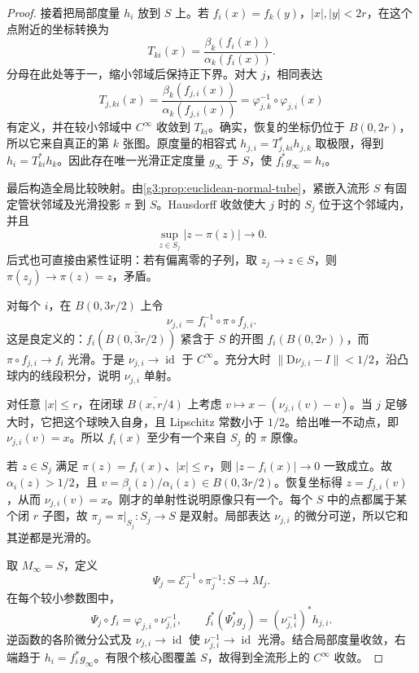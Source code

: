 \begin{proof}
	接着把局部度量 \(h_i\) 放到 \(S\) 上。若 \(f_i(x)=f_k(y)\)，\(|x|,|y|<2r\)，在这个点附近的坐标转换为
	\[
		T_{ki}(x)=\frac{\beta_k(f_i(x))}{\alpha_k(f_i(x))}.
	\]
	分母在此处等于一，缩小邻域后保持正下界。对大 \(j\)，相同表达
	\[
		T_{j,ki}(x)=\frac{\beta_k(f_{j,i}(x))}
		{\alpha_k(f_{j,i}(x))}
		=\varphi_{j,k}^{-1}\circ\varphi_{j,i}(x)
	\]
	有定义，并在较小邻域中 \(C^\infty\) 收敛到 \(T_{ki}\)。确实，恢复的坐标仍位于 \(B(0,2r)\)，所以它来自真正的第 \(k\) 张图。原度量的相容式
	\(h_{j,i}=T_{j,ki}^*h_{j,k}\) 取极限，得到
	\(h_i=T_{ki}^*h_k\)。因此存在唯一光滑正定度量 \(g_\infty\) 于 \(S\)，使 \(f_i^*g_\infty=h_i\)。

	最后构造全局比较映射。由\cref{g3:prop:euclidean-normal-tube}，紧嵌入流形 \(S\) 有固定管状邻域及光滑投影 \(\pi\) 到 \(S\)。Hausdorff 收敛使大 \(j\) 时的 \(S_j\) 位于这个邻域内，并且
	\[
		\sup_{z\in S_j}|z-\pi(z)|\longrightarrow0.
	\]
	后式也可直接由紧性证明：若有偏离零的子列，取 \(z_j\to z\in S\)，则 \(\pi(z_j)\to\pi(z)=z\)，矛盾。

	对每个 \(i\)，在 \(B(0,3r/2)\) 上令
	\[
		\nu_{j,i}=f_i^{-1}\circ\pi\circ f_{j,i}.
	\]
	这是良定义的：\(f_i(\overline{B(0,3r/2)})\) 紧含于 \(S\) 的开图 \(f_i(B(0,2r))\)，而 \(\pi\circ f_{j,i}\to f_i\) 光滑。于是
	\(\nu_{j,i}\to\operatorname{id}\) 于 \(C^\infty\)。充分大时
	\(\|\mathrm D\nu_{j,i}-I\|<1/2\)，沿凸球内的线段积分，说明 \(\nu_{j,i}\) 单射。

	对任意 \(|x|\le r\)，在闭球 \(\overline{B(x,r/4)}\) 上考虑
	\(v\mapsto x-(\nu_{j,i}(v)-v)\)。当 \(j\) 足够大时，它把这个球映入自身，且 Lipschitz 常数小于 \(1/2\)。给出唯一不动点，即 \(\nu_{j,i}(v)=x\)。所以 \(f_i(x)\) 至少有一个来自 \(S_j\) 的 \(\pi\) 原像。

	若 \(z\in S_j\) 满足 \(\pi(z)=f_i(x)\)、\(|x|\le r\)，则 \(|z-f_i(x)|\to0\) 一致成立。故 \(\alpha_i(z)>1/2\)，且
	\(v=\beta_i(z)/\alpha_i(z)\in B(0,3r/2)\)。恢复坐标得 \(z=f_{j,i}(v)\)，从而 \(\nu_{j,i}(v)=x\)。刚才的单射性说明原像只有一个。每个 \(S\) 中的点都属于某个闭 \(r\) 子图，故 \(\pi_j=\pi|_{S_j}:S_j\to S\) 是双射。局部表达 \(\nu_{j,i}\) 的微分可逆，所以它和其逆都是光滑的。

	取 \(M_\infty=S\)，定义
	\[
		\Psi_j=\mathcal E_j^{-1}\circ\pi_j^{-1}:S\longrightarrow M_j.
	\]
	在每个较小参数图中，
	\[
		\Psi_j\circ f_i=\varphi_{j,i}\circ\nu_{j,i}^{-1},\qquad
		f_i^*(\Psi_j^*g_j)=(\nu_{j,i}^{-1})^*h_{j,i}.
	\]
	逆函数的各阶微分公式及 \(\nu_{j,i}\to\operatorname{id}\) 使
	\(\nu_{j,i}^{-1}\to\operatorname{id}\) 光滑。结合局部度量收敛，右端趋于 \(h_i=f_i^*g_\infty\)。有限个核心图覆盖 \(S\)，故得到全流形上的 \(C^\infty\) 收敛。
\end{proof}

